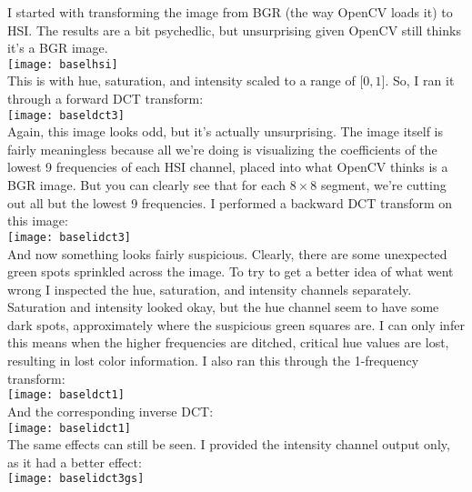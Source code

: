 \documentclass[12pt]{article}
\begin{document}
I started with transforming the image from BGR (the way OpenCV loads it) to HSI.
The results are a bit psychedlic, but unsurprising given OpenCV still thinks
it's a BGR image.\\

\texttt{[image: baselhsi]}\\

This is with hue, saturation, and intensity scaled to a range of $\lbrack0,
1\rbrack$. So, I ran it through a forward DCT transform:\\

\texttt{[image: baseldct3]}\\

Again, this image looks odd, but it's actually unsurprising. The image itself is
fairly meaningless because all we're doing is visualizing the coefficients of
the lowest 9 frequencies of each HSI channel, placed into what OpenCV thinks is
a BGR image. But you can clearly see that for each $8\times8$ segment, we're cutting
out all but the lowest 9 frequencies. I performed a backward DCT
transform on this image:\\

\texttt{[image: baselidct3]}\\

And now something looks fairly suspicious. Clearly, there are some unexpected
green spots sprinkled across the image. To try to get a better idea of what went
wrong I inspected the hue, saturation, and intensity channels separately.
Saturation and intensity looked okay, but the hue channel seem to have some dark
spots, approximately where the suspicious green squares are. I can only infer
this means when the higher frequencies are ditched, critical hue values are
lost, resulting in lost color information. I also ran this through the
1-frequency transform:\\

\texttt{[image: baseldct1]}\\

And the corresponding inverse DCT:\\

\texttt{[image: baselidct1]}\\

The same effects can still be seen. I provided the intensity channel output
only, as it had a better effect:\\

\texttt{[image: baselidct3gs]}\\
\end{document}
